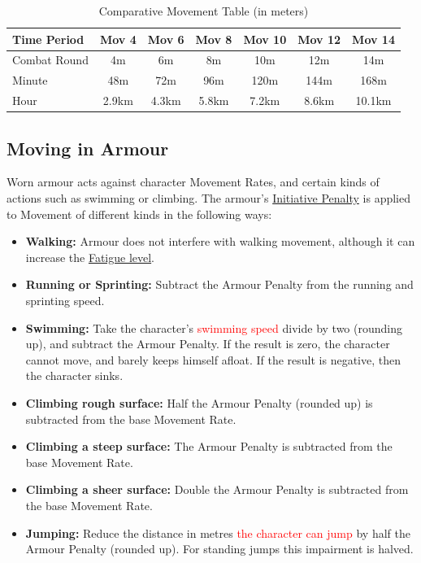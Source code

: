 \documentclass[10pt]{article}
\begin{document}
\begin{table}[h]
\centering
\caption{Comparative Movement Table (in meters)}
\label{tab:comparative-movement}
\begin{tabular}{lcccccc}
\toprule
\textbf{Time Period} & \textbf{Mov 4} & \textbf{Mov 6} & \textbf{Mov 8} & \textbf{Mov 10} & \textbf{Mov 12} & \textbf{Mov 14} \\
\midrule
Combat Round & 4m & 6m & 8m & 10m & 12m & 14m \\
Minute & 48m & 72m & 96m & 120m & 144m & 168m \\
Hour & 2.9km & 4.3km & 5.8km & 7.2km & 8.6km & 10.1km \\
\bottomrule
\end{tabular}
\end{table}

\subsection{Moving in Armour}
\label{sec:armor-movement}
Worn armour acts against character Movement Rates, and certain kinds of actions such as swimming or climbing. The armour's \hyperref[sec:armour]{Initiative Penalty} is applied to Movement of different kinds in the following ways:
\begin{itemize}[leftmargin=*]
    \item \textbf{Walking:} Armour does not interfere with walking movement, although it can increase the \hyperref[sec:fatigue]{Fatigue level}.
    \item \textbf{Running or Sprinting:} Subtract the Armour Penalty from the running and sprinting speed.
    \item \textbf{Swimming:} Take the character's \textcolor{red}{swimming speed}  divide by two (rounding up), and subtract the Armour Penalty. If the result is zero, the character cannot move, and barely keeps himself afloat. If the result is negative, then the character sinks.
    \item \textbf{Climbing rough surface:} Half the Armour Penalty (rounded up) is subtracted from the base Movement Rate.
    \item \textbf{Climbing a steep surface:} The Armour Penalty is subtracted from the base Movement Rate.
    \item \textbf{Climbing a sheer surface:} Double the Armour Penalty is subtracted from the base Movement Rate.
    \item \textbf{Jumping:} Reduce the distance in metres \textcolor{red}{the character can jump}  by half the Armour Penalty (rounded up). For standing jumps this impairment is halved.
\end{itemize}
\end{document}
